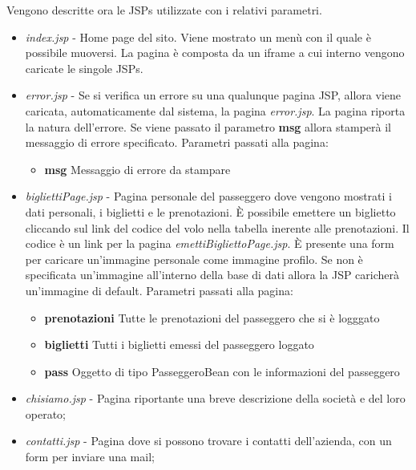 \documentclass[a4paper,10pt]{article}
\begin{document}
Vengono descritte ora le JSPs utilizzate con i relativi parametri.

\begin{itemize}
 \item \textit{index.jsp} - Home page del sito. Viene mostrato un men\`u con il quale \`e possibile muoversi. La pagina \`e composta da un iframe a cui interno vengono
			    caricate le singole JSPs. 
			    
 \item \textit{error.jsp} - Se si verifica un errore su una qualunque pagina JSP, allora viene caricata, automaticamente dal 
			    sistema, la pagina \textit{error.jsp}. La pagina riporta la natura dell'errore. Se viene passato il parametro \textbf{msg} allora 
			    stamper\`a il messaggio di errore specificato. 
 			Parametri passati alla pagina:
			\begin{itemize}
			 \item \textbf{msg} Messaggio di errore da stampare
			\end{itemize}
			
 \item \textit{bigliettiPage.jsp} - Pagina personale del passeggero dove vengono mostrati i dati personali, i biglietti e le prenotazioni. \`E possibile emettere un biglietto cliccando sul link del codice 
				    del volo nella tabella inerente alle prenotazioni. Il codice \`e un link per la pagina \textit{emettiBigliettoPage.jsp}. \`E presente una form per caricare
				    un'immagine personale come immagine profilo. Se non \`e specificata un'immagine all'interno della base di dati allora la JSP caricher\`a un'immagine di default.
 			Parametri passati alla pagina:
			\begin{itemize}
			 \item \textbf{prenotazioni} Tutte le prenotazioni del passeggero che si \`e logggato
			 \item \textbf{biglietti} Tutti i biglietti emessi del passeggero loggato
			 \item \textbf{pass} Oggetto di tipo PasseggeroBean con le informazioni del passeggero
			\end{itemize}
			
 \item \textit{chisiamo.jsp} - Pagina riportante una breve descrizione della societ\`a e del loro operato;
 
 \item \textit{contatti.jsp} - Pagina dove si possono trovare i contatti dell'azienda, con un form per inviare una mail;
 

\end{itemize}
\end{document}

